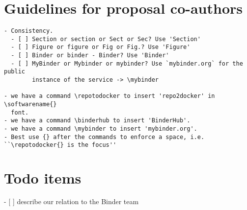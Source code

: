 \documentclass[
  deliverables,
  longtasklabels,
  numericcites,
  noworkareas,
  svgnames,
  \classoptions
]{euproposal}       %
\newcommand{\softwarename}[1]{\texttt{#1}}
\newcommand{\repotodocker}{\softwarename{repo2docker}}
\newcommand{\binderhub}{\softwarename{BinderHub}}
\newcommand{\mybinder}{mybinder.org}   %
\begin{document}
\begin{draft}


\section*{Guidelines for proposal co-authors}

\begin{verbatim}
- Consistency. 
  - [ ] Section or section or Sect or Sec? Use 'Section'
  - [ ] Figure or figure or Fig or Fig.? Use 'Figure'
  - [ ] Binder or binder - Binder? Use 'Binder'
  - [ ] MyBinder or Mybinder or mybinder? Use `mybinder.org` for the public
        instance of the service -> \mybinder

- we have a command \repotodocker to insert 'repo2docker' in \softwarename{}
  font.
- we have a command \binderhub to insert 'BinderHub'.
- we have a command \mybinder to insert 'mybinder.org'.
- Best use {} after the commands to enforce a space, i.e. ``\repotodocker{} is the focus''

\end{verbatim}

\section*{Todo items}
- [ ] describe our relation to the Binder team

\end{draft}
\clearpage
\end{document}
